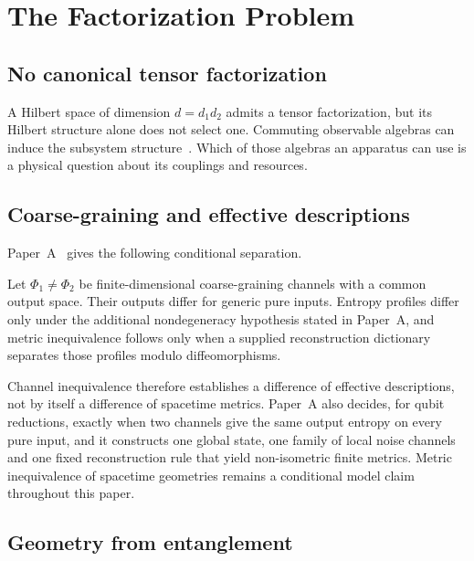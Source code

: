 \section{The Factorization Problem}
\label{sec:factorization}

\subsection{No canonical tensor factorization}

A Hilbert space of dimension $d=d_1d_2$ admits a tensor factorization,
but its Hilbert structure alone does not select one. Commuting observable
algebras can induce the subsystem structure~\cite{Zanardi2001,Zanardi2004}.
Which of those algebras an apparatus can use is a physical question about
its couplings and resources.

\subsection{Coarse-graining and effective descriptions}

Paper~A~\cite{Liu2026PaperA} gives the following conditional separation.

\begin{proposition}
\label{prop:inequiv}
Let $\Phi_1\ne\Phi_2$ be finite-dimensional coarse-graining channels with a common output space. Their outputs differ for generic pure inputs. Entropy profiles differ only under the additional nondegeneracy hypothesis stated in Paper~A, and metric inequivalence follows only when a supplied reconstruction dictionary separates those profiles modulo diffeomorphisms.
\end{proposition}

Channel inequivalence therefore establishes a difference of effective descriptions, not by itself a difference of spacetime metrics. Paper~A also decides, for qubit reductions, exactly when two channels give the same output entropy on every pure input, and it constructs one global state, one family of local noise channels and one fixed reconstruction rule that yield non-isometric finite metrics. Metric inequivalence of spacetime geometries remains a conditional model claim throughout this paper.

\subsection{Geometry from entanglement}

